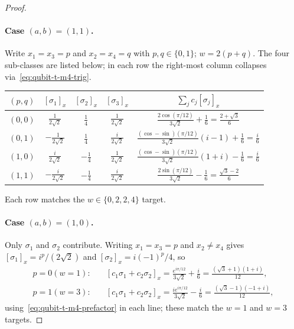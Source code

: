 \documentclass[11pt]{article}
\theoremstyle{definition}
\begin{document}
\begin{proof}
		\paragraph{Case $(a, b) = (1, 1)$.}
		Write $x_1 = x_3 = p$ and $x_2 = x_4 = q$ with $p, q \in \{0, 1\}$;
		$w = 2(p + q)$. The four sub-classes are listed below; in each
		row the right-most column collapses via~\eqref{eq:qubit-t-m4-trig}.
		\begin{center}
			\small
			\renewcommand{\arraystretch}{1.2}
			\begin{tabular}{c|ccc|c}
				\toprule
				$(p, q)$ & $[\sigma_1]_x$ & $[\sigma_2]_x$ & $[\sigma_3]_x$ & $\sum_j c_j [\sigma_j]_x$ \\
				\midrule
				$(0, 0)$ & $\frac{1}{2\sqrt 2}$  & $\frac{1}{4}$  & $\frac{1}{2\sqrt 2}$  & $\frac{2 \cos(\pi/12)}{3\sqrt 2} + \frac{1}{6} = \frac{2 + \sqrt 3}{6}$ \\
				$(0, 1)$ & $-\frac{1}{2\sqrt 2}$ & $\frac{1}{4}$  & $\frac{i}{2\sqrt 2}$  & $\frac{(\cos - \sin)(\pi/12)}{3\sqrt 2}(i - 1) + \frac{1}{6} = \frac{i}{6}$ \\
				$(1, 0)$ & $\frac{i}{2\sqrt 2}$  & $-\frac{1}{4}$ & $\frac{1}{2\sqrt 2}$  & $\frac{(\cos - \sin)(\pi/12)}{3\sqrt 2}(1 + i) - \frac{1}{6} = \frac{i}{6}$ \\
				$(1, 1)$ & $-\frac{i}{2\sqrt 2}$ & $-\frac{1}{4}$ & $\frac{i}{2\sqrt 2}$  & $\frac{2 \sin(\pi/12)}{3\sqrt 2} - \frac{1}{6} = \frac{\sqrt 3 - 2}{6}$ \\
				\bottomrule
			\end{tabular}
		\end{center}
		Each row matches the $w \in \{0, 2, 2, 4\}$ target.

		\paragraph{Case $(a, b) = (1, 0)$.}
		Only $\sigma_1$ and $\sigma_2$ contribute. Writing
		$x_1 = x_3 = p$ and $x_2 \ne x_4$ gives
		$[\sigma_1]_x = i^p / (2\sqrt 2)$ and
		$[\sigma_2]_x = i (-1)^p / 4$, so
		\begin{align}
			p = 0 (w = 1):\quad &
			[c_1 \sigma_1 + c_2 \sigma_2]_x
			= \frac{e^{i \pi / 12}}{3\sqrt 2} + \frac{i}{6}
			= \frac{(\sqrt 3 + 1)(1 + i)}{12},\\
			p = 1 (w = 3):\quad &
			[c_1 \sigma_1 + c_2 \sigma_2]_x
			= \frac{i e^{i \pi / 12}}{3\sqrt 2} - \frac{i}{6}
			= \frac{(\sqrt 3 - 1)(-1 + i)}{12},
		\end{align}
		using~\eqref{eq:qubit-t-m4-prefactor} in each line; these match
		the $w = 1$ and $w = 3$ targets.


\end{proof}
\end{document}
